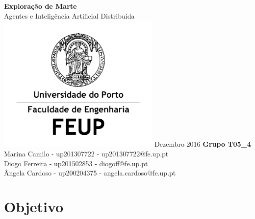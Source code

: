 \documentclass[12pt]{report}
\begin{document}
\newcommand{\sajas}{\texttt{SAJaS}\xspace}
\newcommand{\jade}{\texttt{JADE}\xspace}
\newcommand{\repast}{\texttt{Repast 3}\xspace}
\newcommand{\massim}{\texttt{MASSim2Dev}\xspace}
\newcommand{\java}{\texttt{JAVA}\xspace}
\newcommand{\acl}{\texttt{ACL}\xspace}
\newcommand{\fipa}{\texttt{FIPA}\xspace}
\newcommand{\spotter}{\emph{spotter}\xspace}
\newcommand{\Spotter}{\emph{Spotter}\xspace}
\newcommand{\spotters}{\emph{spotters}\xspace}
\newcommand{\Producer}{\emph{Producer}\xspace}
\newcommand{\producer}{\emph{producer}\xspace}
\newcommand{\producers}{\emph{producers}\xspace}
\newcommand{\Transporter}{\emph{Transporter}\xspace}
\newcommand{\transporter}{\emph{transporter}\xspace}
\newcommand{\transporters}{\emph{transporters}\xspace}


\begin{titlepage}
	\begin{center}
		\vspace*{1cm}
        \Huge
        \textbf{Exploração de Marte}
        \vspace{0.5cm} \ \\
        \LARGE
        Agentes e Inteligência Artificial Distribuída
        \vfill
		\includegraphics[width=0.6\textwidth]{FEUP_Logo}
		\break
        \small
        Dezembro 2016
        \vfill
		\vspace{1.5cm}
        \normalsize{
		\textbf{Grupo T05\_4} \\
		Marina Camilo - up201307722 - up201307722@fe.up.pt \\
		Diogo Ferreira - up201502853 - diogoff@fe.up.pt \\
		Ângela Cardoso - up200204375 - angela.cardoso@fe.up.pt
        }
	\end{center}
\end{titlepage}

\tableofcontents

\chapter{Objetivo}
\end{document}
